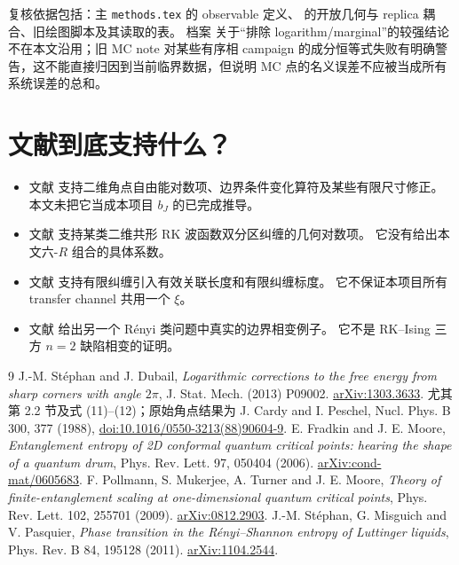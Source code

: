 \documentclass[11pt]{article}
\begin{document}
复核依据包括：主 \texttt{methods.tex} 的 observable 定义、
 的开放几何与 replica 耦合、旧绘图脚本及其读取的表。
档案 
关于“排除 logarithm/marginal”的较强结论不在本文沿用；旧 MC note 对某些有序相
campaign 的成分恒等式失败有明确警告，这不能直接归因到当前临界数据，但说明
MC 点的名义误差不应被当成所有系统误差的总和。

\section{文献到底支持什么？}
\begin{itemize}
\item 文献\cite{SD} 支持二维角点自由能对数项、边界条件变化算符及某些有限尺寸修正。
本文未把它当成本项目 $b_J$ 的已完成推导。
\item 文献\cite{FM} 支持某类二维共形 RK 波函数双分区纠缠的几何对数项。
它没有给出本文六-$R$ 组合的具体系数。
\item 文献\cite{Pollmann} 支持有限纠缠引入有效关联长度和有限纠缠标度。
它不保证本项目所有 transfer channel 共用一个 $\xi$。
\item 文献\cite{SMP} 给出另一个 Rényi 类问题中真实的边界相变例子。
它不是 RK--Ising 三方 $n=2$ 缺陷相变的证明。
\end{itemize}
\begin{thebibliography}{9}
 J.-M. Stéphan and J. Dubail,
\emph{Logarithmic corrections to the free energy from sharp corners with angle $2\pi$},
J. Stat. Mech. (2013) P09002.
\href{https://arxiv.org/abs/1303.3633}{arXiv:1303.3633}.
尤其第 2.2 节及式 (11)--(12)；原始角点结果为 J. Cardy and I. Peschel,
Nucl. Phys. B 300, 377 (1988),
\href{https://doi.org/10.1016/0550-3213(88)90604-9}{doi:10.1016/0550-3213(88)90604-9}.
 E. Fradkin and J. E. Moore,
\emph{Entanglement entropy of 2D conformal quantum critical points: hearing the shape of a quantum drum},
Phys. Rev. Lett. 97, 050404 (2006).
\href{https://arxiv.org/abs/cond-mat/0605683}{arXiv:cond-mat/0605683}.
 F. Pollmann, S. Mukerjee, A. Turner and J. E. Moore,
\emph{Theory of finite-entanglement scaling at one-dimensional quantum critical points},
Phys. Rev. Lett. 102, 255701 (2009).
\href{https://arxiv.org/abs/0812.2903}{arXiv:0812.2903}.
 J.-M. Stéphan, G. Misguich and V. Pasquier,
\emph{Phase transition in the Rényi--Shannon entropy of Luttinger liquids},
Phys. Rev. B 84, 195128 (2011).
\href{https://arxiv.org/abs/1104.2544}{arXiv:1104.2544}.
\end{thebibliography}
\end{document}

